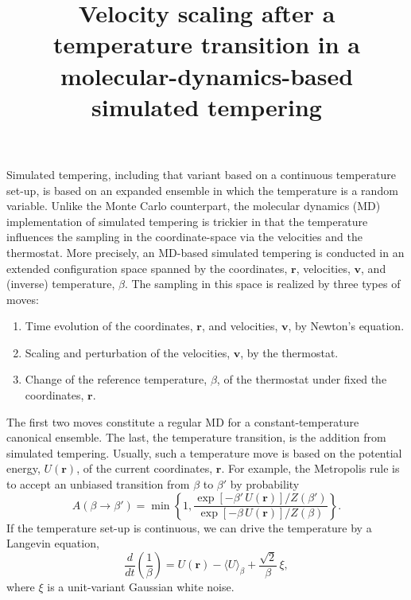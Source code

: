 \documentclass[11pt]{article}
\begin{document}
\title{Velocity scaling after a temperature transition in a molecular-dynamics-based simulated tempering}
\author{}
\date{\vspace{-10ex}}
\maketitle

Simulated tempering\cite{lyubartsev1992, marinari1992},
including that variant based on a continuous temperature set-up\cite{zhang2010},
is based on an expanded ensemble in which
the temperature is a random variable.
%
Unlike the Monte Carlo counterpart,
the molecular dynamics (MD) implementation of simulated tempering
is trickier in that the temperature influences
the sampling in the coordinate-space
via the velocities and the thermostat.
%
More precisely, an MD-based simulated tempering
is conducted in an extended configuration space
spanned by the coordinates, $\mathbf r$,
velocities, $\mathbf v$,
and (inverse) temperature, $\beta$.
%
The sampling in this space is realized
by three types of moves:
%
\begin{enumerate}
  \item
    Time evolution of the coordinates, $\mathbf r$, and velocities, $\mathbf v$, by Newton's equation.

  \item
    Scaling and perturbation of the velocities, $\mathbf v$, by the thermostat.

  \item
    Change of the reference temperature, $\beta$, of the thermostat
    under fixed the coordinates, $\mathbf r$.
\end{enumerate}
%
The first two moves constitute
a regular MD for a constant-temperature canonical ensemble.
%
The last, the temperature transition,
is the addition from simulated tempering.
%
Usually, such a temperature move is based on
the potential energy, $U(\mathbf r)$,
of the current coordinates, $\mathbf r$.
%
For example,
the Metropolis rule is to accept an unbiased transition
from $\beta$ to $\beta'$ by probability
%
\begin{equation}
  A(\beta \to \beta')
  =
  \min\left\{
    1,
    \frac{
      \exp[ -\beta' \, U(\mathbf r) ] / Z(\beta')
    }
    {
      \exp[ -\beta \, U(\mathbf r) ] / Z(\beta)
    }
  \right\}
  .
  \label{eq:Tmove_Metropolis}
\end{equation}
%
If the temperature set-up is continuous,
we can drive the temperature by a Langevin equation\cite{zhang2010},
%
\begin{equation}
  \frac{ d } { dt }
  \left(
  \frac{ 1 } { \beta }
  \right)
  =
  U(\mathbf r)
  -
  \langle U \rangle_\beta
  +
  \frac{ \sqrt 2  } { \beta } \, \xi
  ,
  \label{eq:Tmove_Langevin}
\end{equation}
%
where $\xi$ is a unit-variant Gaussian white noise.
\end{document}
